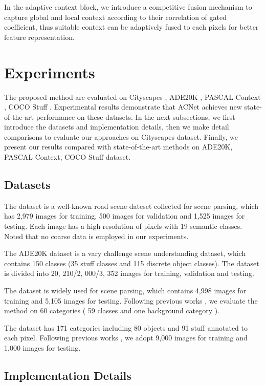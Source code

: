 \documentclass[10pt,twocolumn,letterpaper]{article}
\begin{document}
In the adaptive context block, we introduce a competitive fusion mechanism to capture global and local  context  according to their correlation of gated coefficient, thus suitable context can be adaptively fused to each pixels for better feature representation.


\section{Experiments}
The proposed method are evaluated on Cityscapes \cite{cityscapes}, ADE20K \cite{zhou2017scene}, PASCAL Context \cite{pcontext}, COCO Stuff \cite{caesar2018coco}.
Experimental results demonstrate that ACNet achieves new state-of-the-art performance on these  datasets. 
 In the next subsections,  we first introduce the datasets and  implementation details, then we make detail comparisons to evaluate our approaches on Cityscapes dataset. Finally, we present our  results  compared with state-of-the-art methods on ADE20K, PASCAL Context, COCO Stuff dataset.

\subsection{Datasets}
 The dataset is a well-known road scene dateset collected for scene parsing, which
 has  2,979 images for training, 500 images  for validation and 1,525 images for testing. 
Each image has a high resolution of  pixels with 19 semantic classes. Noted that no coarse data is employed  in our experiments.
 
 The ADE20K dataset is a vary challenge scene understanding dataset, which  contains 150 classes (35 stuff classes and 115 discrete object classes). The dataset is divided into 20, 210/2, 000/3, 352 images for training, validation and testing. 

 The dataset is widely used for scene parsing, which contains 4,998 images for training and 5,105 images for testing. Following previous works \cite{refinenet,encnet}, we evaluate the method on  60 categories ( 59
classes  and one background category ).

  The dataset has 171 categories including 80 objects and 91 stuff
annotated to each pixel.  Following previous works \cite{ding2018context,DAGRNN,refinenet}, we adopt 9,000 images for training and 1,000 images for testing. 


\subsection{Implementation Details}
\end{document}

